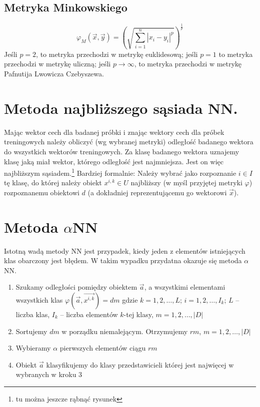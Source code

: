 \documentclass[a4paper,10pt]{article}
\begin{document}
\subsection{Metryka Minkowskiego}
\begin{equation}
  \varphi_M(\overrightarrow{x}, \overrightarrow{y}) = \left(\sqrt{\sum_{i = 1}^n |x_i - y_i|^p}\right)^{\frac{1}{p}}
\end{equation}
Jeśli $p = 2$, to metryka przechodzi w metrykę euklidesową; jeśli $p = 1$ to metryka przechodzi w metrykę uliczną; jeśli $p \rightarrow \infty$, to metryka przechodzi w metrykę Pafnutija Lwowicza Czebyszewa.

\section{Metoda najbliższego sąsiada NN.}
Mając wektor cech dla badanej próbki i znając wektory cech dla próbek treningowych należy obliczyć (wg wybranej metryki) odległość badanego wektora do wszystkich wektorów treningowych. Za klasę badanego wektora uznajemy klasę jaką miał wektor, którego odległość jest najmniejsza. Jest on więc najbliższym sąsiadem.\footnote{tu można jeszcze rąbnąć rysunek}
Bardziej formalnie: Należy wybrać jako rozpoznanie $i \in I$ tę klasę, do której należy obiekt $x^{i,k} \in U$ najbliższy (w myśl przyjętej metryki $\varphi$) rozpoznanemu obiektowi $d$ (a dokładniej reprezentującemu go wektorowi $\overrightarrow{x}$).

\section{Metoda $\alpha$NN}
Istotną wadą metody NN jest przypadek, kiedy jeden z elementów istniejących klas obarczony jest błędem. W takim wypadku przydatna okazuje się metoda $\alpha$NN.
\begin{enumerate}
\item Szukamy odległości pomiędzy obiektem $\overrightarrow{a}$, a wszystkimi elementami wszystkich klas $\varphi(\overrightarrow{a},\overrightarrow{x^{i,k}})=dm$ gdzie $k = 1, 2, \ldots, L$; $i = 1,2, \ldots, I_k$; $L$ – liczba klas, $I_k$ – liczba elementów $k$-tej klasy, $m=1,2,\ldots,|D|$
\item Sortujemy $dm$ w porządku niemalejącym. Otrzymujemy $rm$, $m = 1,2,\ldots, |D|$
\item Wybieramy $\alpha$ pierwszych elementów ciągu $rm$
\item Obiekt $\overrightarrow{a}$ klasyfikujemy do klasy przedstawicieli której jest najwięcej w wybranych w kroku 3
\end{enumerate}
\end{document}

